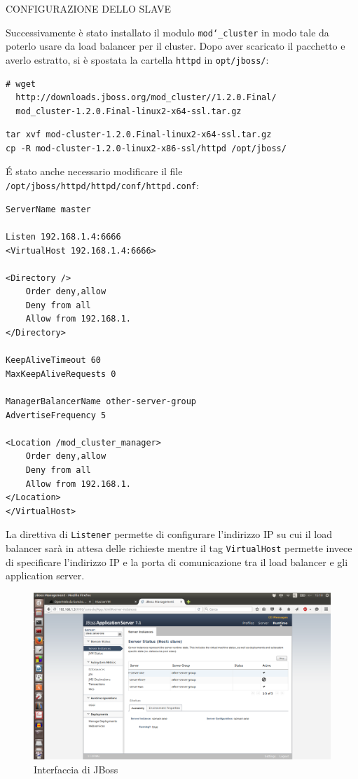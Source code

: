\documentclass[twoside]{article}
\begin{document}
CONFIGURAZIONE DELLO SLAVE

Successivamente è stato installato il modulo \texttt{mod\char`_cluster} in modo tale da poterlo
usare da load balancer per il cluster. Dopo aver scaricato il pacchetto e averlo estratto,
si è spostata la cartella \texttt{httpd} in \texttt{opt/jboss/}:
\begin{lstlisting}[frame=trBL]
# wget
  http://downloads.jboss.org/mod_cluster//1.2.0.Final/
  mod_cluster-1.2.0.Final-linux2-x64-ssl.tar.gz
\end{lstlisting}
\begin{lstlisting}[frame=trBL]
tar xvf mod-cluster-1.2.0.Final-linux2-x64-ssl.tar.gz
cp -R mod-cluster-1.2.0-linux2-x86-ssl/httpd /opt/jboss/
\end{lstlisting}
\'{E} stato anche necessario modificare il file \texttt{/opt/jboss/httpd/httpd/conf/httpd.conf}:
\begin{lstlisting}[frame=trBL]
ServerName master

Listen 192.168.1.4:6666
<VirtualHost 192.168.1.4:6666>

<Directory />
	Order deny,allow
	Deny from all
	Allow from 192.168.1.
</Directory>

KeepAliveTimeout 60
MaxKeepAliveRequests 0

ManagerBalancerName other-server-group
AdvertiseFrequency 5

<Location /mod_cluster_manager>
	Order deny,allow
	Deny from all
	Allow from 192.168.1.
</Location>
</VirtualHost>
\end{lstlisting}
La direttiva di \texttt{Listener} permette di configurare l'indirizzo IP su cui il load balancer sarà
in attesa delle richieste mentre il tag \texttt{VirtualHost} permette invece di specificare l’indirizzo IP e
la porta di comunicazione tra il load balancer e gli application server.

\begin{figure}[!bp]
\centering
\includegraphics[width=13cm]{immagine1.png}
\caption{Interfaccia di JBoss}\label{fig:1}
\end{figure}
\end{document}
